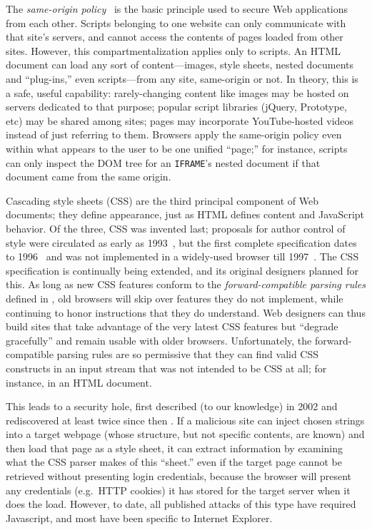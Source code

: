 \documentclass{acm_proc_article-sp}
\begin{document}
The \emph{same-origin policy}~\cite{mozillasameorigin} is the basic
principle used to secure Web applications from each other.  Scripts
belonging to one website can only communicate with that site's
servers, and cannot access the contents of pages loaded from other
sites.  However, this compartmentalization applies only to scripts.
An HTML document can load any sort of content---images, style sheets,
nested documents and “plug-ins,” even scripts---from any site,
same-origin or not.  In theory, this is a safe, useful capability:
rarely-changing content like images may be hosted on servers dedicated
to that purpose; popular script libraries (jQuery, Prototype, etc) may
be shared among sites; pages may incorporate YouTube-hosted videos
instead of just referring to them.  Browsers apply the same-origin
policy even within what appears to the user to be one unified “page;”
for instance, scripts can only inspect the DOM tree for an
\texttt{IFRAME}'s nested document if that document came from the same
origin.

Cascading style sheets (CSS) are the third principal component of Web
documents; they define appearance, just as HTML defines content and
JavaScript behavior.  Of the three, CSS was invented last; proposals
for author control of style were circulated as early as
1993~\cite{css-history}, but the first complete specification dates to
1996~\cite{css1} and was not implemented in a widely-used browser till
1997~\cite{eich}.  The CSS specification is continually being
extended, and its original designers planned for this.  As long as new
CSS features conform to the \emph{forward-compatible parsing rules}
defined in \cite{syndata}, old browsers will skip over features they
do not implement, while continuing to honor instructions that they do
understand.  Web designers can thus build sites that take advantage of
the very latest CSS features but “degrade gracefully” and remain
usable with older browsers.  Unfortunately, the forward-compatible
parsing rules are so permissive that they can find valid CSS
constructs in an input stream that was not intended to be CSS at all;
for instance, in an HTML document.

This leads to a security hole, first described (to our knowledge) in
2002 \cite{cssxss02} and rediscovered at least twice since then
\cite{cssxss05,cssxss08}.  If a malicious site can inject chosen
strings into a target webpage (whose structure, but not specific
contents, are known) and then load that page as a style sheet, it can
extract information by examining what the CSS parser makes of this
“sheet.”  even if the target page cannot be retrieved
without presenting login credentials, because the browser will present
any credentials (e.g.\ HTTP cookies) it has stored for the target
server when it does the load.  However, to date, all published attacks
of this type have required Javascript, and most have been specific to
Internet Explorer.
\end{document}

